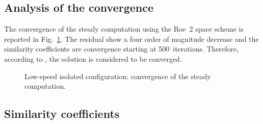 
\subsection{Analysis of the convergence}
\label{sub:dream_ls_conv_coeff}

The convergence of the steady computation using the Roe~2 space scheme
is reported in Fig.~\ref{fig:dream_ls_convergence_roe2}. The residual
show a four order of magnitude decrease and the similarity
coefficients are convergence starting at 500~iterations.
Therefore, according to \citet{Casey2000}, the
solution is considered to be converged.
\begin{figure}
  \centering
  \caption{Low-speed isolated configuration: convergence of the steady
  computation.}
  \label{fig:dream_ls_convergence_roe2}
\end{figure}

\subsection{Similarity coefficients}
\label{sub:dream_ls_sim_coeff}

